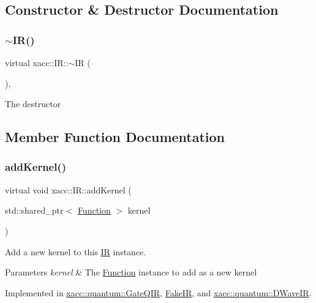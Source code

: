 \subsection{Constructor \& Destructor Documentation}
\mbox{\label{a02480_a09a76d71092254acae07e19fa2f34921}} 
\subsubsection{\texorpdfstring{$\sim$\+I\+R()}{~IR()}}
{\footnotesize\ttfamily virtual xacc\+::\+I\+R\+::$\sim$\+IR (\begin{DoxyParamCaption}{ }\end{DoxyParamCaption})\hspace{0.3cm}{\ttfamily [inline]}, {\ttfamily [virtual]}}

The destructor 

\subsection{Member Function Documentation}
\mbox{\label{a02480_abbbf8e6993c518597de32cd05d49d737}} 
\subsubsection{\texorpdfstring{add\+Kernel()}{addKernel()}}
{\footnotesize\ttfamily virtual void xacc\+::\+I\+R\+::add\+Kernel (\begin{DoxyParamCaption}\item[{std\+::shared\+\_\+ptr$<$ \hyperlink{a02456}{Function} $>$}]{kernel }\end{DoxyParamCaption})\hspace{0.3cm}{\ttfamily [pure virtual]}}

Add a new kernel to this \hyperlink{a02480}{IR} instance.


\begin{DoxyParams}{Parameters}
{\em kernel} & The \hyperlink{a02456}{Function} instance to add as a new kernel \\
\hline
\end{DoxyParams}


Implemented in \hyperlink{a01296_aa6ed2cf2cbcfec8105c327a4fa95346f}{xacc\+::quantum\+::\+Gate\+Q\+IR}, \hyperlink{a02492_a526ef10e1ee21f5552b1ca61872f541a}{Fake\+IR}, and \hyperlink{a01268_a7e1ddff2771233dc45f60a6b7e15ef63}{xacc\+::quantum\+::\+D\+Wave\+IR}.

